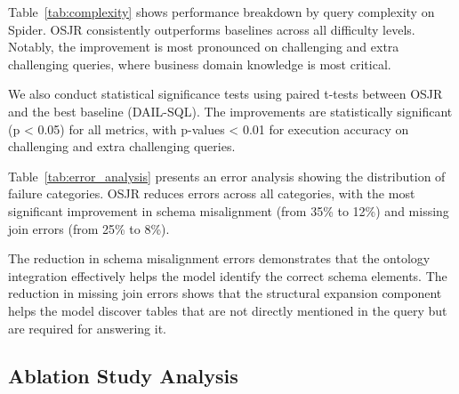 \documentclass[sigconf, nonatbib]{acmart}
\begin{document}
Table~\ref{tab:complexity} shows performance breakdown by query complexity on Spider. OSJR consistently outperforms baselines across all difficulty levels. Notably, the improvement is most pronounced on challenging and extra challenging queries, where business domain knowledge is most critical.

We also conduct statistical significance tests using paired t-tests between OSJR and the best baseline (DAIL-SQL). The improvements are statistically significant (p < 0.05) for all metrics, with p-values < 0.01 for execution accuracy on challenging and extra challenging queries.

\begin{table}[t]
    \caption{Error Analysis: Failure Distribution}
    \label{tab:error_analysis}
    \centering
\end{table}

Table~\ref{tab:error_analysis} presents an error analysis showing the distribution of failure categories. OSJR reduces errors across all categories, with the most significant improvement in schema misalignment (from 35\% to 12\%) and missing join errors (from 25\% to 8\%).

The reduction in schema misalignment errors demonstrates that the ontology integration effectively helps the model identify the correct schema elements. The reduction in missing join errors shows that the structural expansion component helps the model discover tables that are not directly mentioned in the query but are required for answering it.

\subsection{Ablation Study Analysis}
\end{document}
